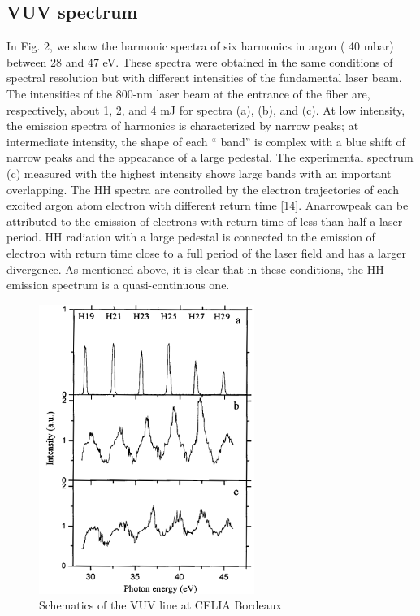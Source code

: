 \subsection{VUV spectrum}

In Fig. 2, we show the harmonic spectra of six harmonics in
argon ( 40 mbar) between 28 and 47 eV. These spectra were
obtained in the same conditions of spectral resolution but with
different intensities of the fundamental laser beam. The intensities
of the 800-nm laser beam at the entrance of the fiber are,
respectively, about 1, 2, and 4 mJ for spectra (a), (b), and (c).
At low intensity, the emission spectra of harmonics is characterized
by narrow peaks; at intermediate intensity, the shape of
each “ band” is complex with a blue shift of narrow peaks and
the appearance of a large pedestal. The experimental spectrum
(c) measured with the highest intensity shows large bands with
an important overlapping.
The HH spectra are controlled by the electron trajectories of
each excited argon atom electron with different return time [14].
Anarrowpeak can be attributed to the emission of electrons with
return time of less than half a laser period. HH radiation with a
large pedestal is connected to the emission of electron with return
time close to a full period of the laser field and has a larger
divergence. As mentioned above, it is clear that in these conditions,
the HH emission spectrum is a quasi-continuous one.

\begin{figure}[htbp]
\begin{center}
\includegraphics[width=7cm]{../Pictures/Chapter_7/VUV_spectrum.png}
\end{center}
\caption[VUV spectrum]{Schematics of the VUV line at CELIA Bordeaux}
\label{fig:VUV_spectrum}
\end{figure}

